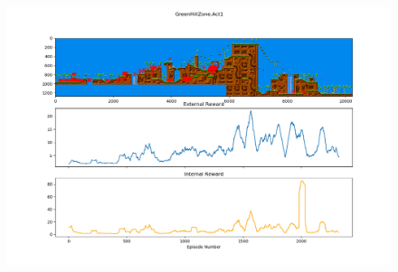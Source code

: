 \begin{figure}[!hbtp]
\includegraphics[width=\textwidth]{images/mlunder_figure.png}
\caption{}
\end{figure}





